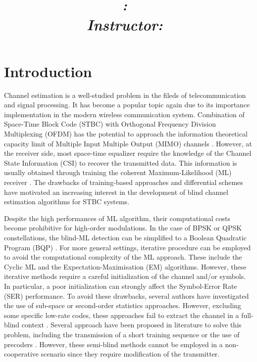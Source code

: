 \documentclass[letterpaper,10pt]{article}
\title{
    \vspace{2in}
    \textmd{\textbf{\projectname}}\\
    \normalsize\vspace{0.3in}\large{\textit{\hmwkClass:\ \hmwkTitle}}\\
    \vspace{0.1in}\large{\textit{Instructor:\ \hmwkClassInstructor}}
    \vspace{3in}
}
\author{\textbf{\hmwkAuthorName}}
\date{}
\begin{document}
\maketitle

\pagebreak

\section{Introduction}

Channel estimation is a well-studied problem in the fileds of telecommunication and signal processing. It has become a popular topic again due to its importance implementation in the modern wireless communication system. Combination of Space-Time Block Code (STBC) with Orthogonal Frequency Division Multiplexing (OFDM) has the potential to approach the information theoretical capacity limit of Multiple Input Multiple Output (MIMO) channels \cite{Ganesan:2001}. However, at the receiver side, most space-time equalizer require the knowledge of the Channel State Information (CSI) to recover the transmitted data. This information is usually obtained through training the coherent Maximum-Likelihood (ML) receiver \cite{Larsson:2003}. The drawbacks of training-based approaches and differential schemes have motivated an increasing interest in the development of blind channel estimation algorithms for STBC systems. 

Despite the high performances of ML algorithm, their computational costs become prohibitive for high-order modulations. In the case of BPSK or QPSK constellations, the blind-ML detection can be simplified to a Boolean Quadratic Program (BQP) \cite{Ma:2006}. For more general settings, iterative procedure can be employed to avoid the computational complexity of the ML approach. These include the Cyclic ML \cite{Larsson:2003} and the Expectation-Maximisation (EM) \cite{Li:2001} algorithms. However, these iterative methods require a careful initialization of the channel and/or symbols. In particular, a poor initialization can strongly affect the Symbol-Error Rate (SER) performance. To avoid these drawbacks, several authors have investigated the use of sub-space \cite{Ammar:2007} or second-order statistics \cite{Shahbazpanahi:2005, Via:2008} approaches. However, excluding some specific low-rate codes, these approaches fail to extract the channel in a full-blind context \cite{Ammar:2007, Shahbazpanahi:2005, Via:2008}. Several approach have been proposed in literature to solve this problem, including the transmission of a short training sequence \cite{Ammar:2007} or the use of precoders \cite{Via:2008}. However, these semi-blind methods cannot be employed in a non-cooperative scenario since they require modification of the transmitter.
\end{document}
